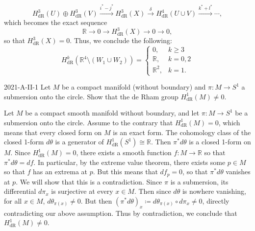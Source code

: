 \documentclass{article}
\begin{document}
	\begin{equation*}
		H^{3}_{\text{dR}}(U) \oplus H^{3}_{\text{dR}}(V) \xrightarrow{i^\ast - j^\ast} H^{3}_{\text{dR}}(X) \xrightarrow{\delta} H^{4}_{\text{dR}}(U \cup V) \xrightarrow{k^\ast + l^\ast} \dotsm, 
	\end{equation*} 
	which becomes the exact sequence 
	\begin{equation*}
		\mathbb{R}\to 0 \to H^{3}_{\text{dR}}(X) \to 0 \to 0, 
	\end{equation*}
	so that $H^{3}_{\text{dR}}(X) = 0$. Thus, we conclude the following: 
	\begin{equation*}
		H^{k}_{\text{dR}}(\mathbb{R}^{4}\setminus (W_1 \cup W_2)) = 
		\begin{cases}
			0, & k \geq 3 \\
			\mathbb{R}, & k = 0, 2 \\
			\mathbb{R}^2, & k = 1. 
		\end{cases}
	\end{equation*}
	
	\begin{prb}{2021-A-II-1}
		Let $M$ be a compact manifold (without boundary) and $\pi: M \to S^{1}$ a submersion onto the circle. Show that the de Rham group $H^{1}_{\text{dR}}(M) \neq 0$. 
	\end{prb}
	Let $M$ be a compact smooth manifold without boundary, and let $\pi: M \to S^{1}$ be a submersion onto the circle. Assume to the contrary that $H^{1}_{\text{dR}}(M) = 0$, which means that every closed form on $M$ is an exact form. The cohomology class of the closed 1-form $d\theta$ is a generator of $H^{1}_{\text{dR}}(S^{1}) \cong \mathbb{R}$. Then $\pi^{\ast}d\theta$ is a closed 1-form on $M$. Since $H^{1}_{\text{dR}}(M) = 0$, there exists a smooth function $f: M \to \mathbb{R}$ so that $\pi^{\ast}d\theta = df$. In particular, by the extreme value theorem, there exists some $p \in M$ so that $f$ has an extrema at $p$. But this means that $df_{p} =0$, so that $\pi^{\ast}d\theta$ vanishes at $p$. We will show that this is a contradiction. Since $\pi$ is a submersion, its differential $d\pi_{x}$ is surjective at every $x \in M$. Then since $d\theta$ is nowhere vanishing, for all $x \in M$, $d\theta_{\pi(x)} \neq 0$. But then $(\pi^{\ast}d\theta)_{x} \coloneqq d\theta_{\pi(x)} \circ d\pi_{x} \neq 0$, directly contradicting our above assumption. Thus by contradiction, we conclude that $H^{1}_{\text{dR}}(M) \neq 0$.    
	
\end{document}
